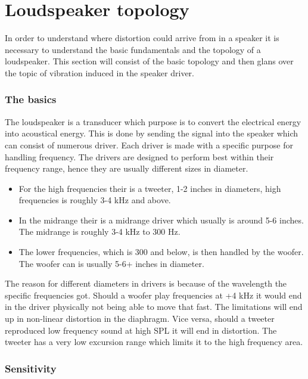 \section{Loudspeaker topology}

In order to understand where distortion could arrive from in a speaker it is necessary to understand the basic fundamentals and the topology of a loudspeaker. This section will consist of the basic topology and then glans over the topic of vibration induced in the speaker driver.

\subsubsection*{The basics}
The loudspeaker is a transducer which purpose is to convert the electrical energy into acoustical energy. This is done by sending the signal into the speaker which can consist of numerous driver. Each driver is made with a specific purpose for handling frequency. The drivers are designed to perform best within their frequency range, hence they are usually different sizes in diameter.
\begin{itemize}
\item[] For the high frequencies their is a tweeter, 1-2 inches in diameters, high frequencies is roughly 3-4 kHz and above.
\item[] In the midrange their is a midrange driver which usually is around 5-6 inches. The midrange is roughly 3-4 kHz to 300 Hz. 
\item[] The lower frequencies, which is 300 and below, is then handled by the woofer. The woofer can is usually 5-6+ inches in diameter.
\end{itemize}
The reason for different diameters in drivers is because of the wavelength the specific frequencies got. Should a woofer play frequencies at +4 kHz it would end in the driver physically not being able to move that fast. The limitations will end up in non-linear distortion in the diaphragm. Vice versa, should a tweeter reproduced low frequency sound at high \gls{SPL} it will end in distortion. The tweeter has a very low excursion range which limits it to the high frequency area.

\subsubsection*{Sensitivity}

